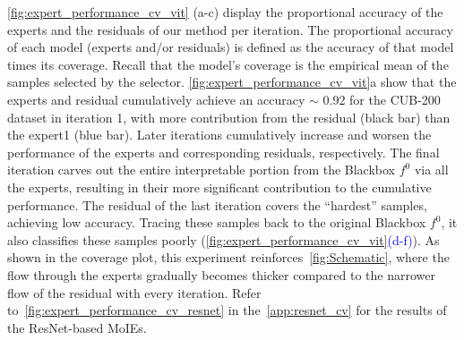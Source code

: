 \cref{fig:expert_performance_cv_vit} (a-c) display the proportional accuracy of the experts and the residuals of our method per iteration. The proportional accuracy of each model (experts and/or residuals) is defined as the accuracy of that model times its coverage. Recall that the model's coverage is the empirical mean of the samples selected by the selector. 
\cref{fig:expert_performance_cv_vit}a show that the experts and residual cumulatively achieve an accuracy $\sim$ 0.92 for the CUB-200 dataset in iteration 1, with more contribution from the residual (black bar) than the expert1 (blue bar). Later iterations cumulatively increase and worsen the performance of the experts and corresponding residuals, respectively. The final iteration carves out the entire interpretable portion from the Blackbox $f^0$ via all the experts, resulting in their more significant contribution to the cumulative performance. The residual of the last iteration covers the ``hardest'' samples, achieving low accuracy. Tracing these samples back to the original Blackbox $f^0$, it also classifies these samples poorly (\cref{fig:expert_performance_cv_vit}\textcolor{blue}{(d-f)}).
As shown in the coverage plot, this experiment reinforces~\cref{fig:Schematic}, where the flow through the experts gradually becomes thicker compared to the narrower flow of the residual with every iteration. Refer to~\cref{fig:expert_performance_cv_resnet} in the~\cref{app:resnet_cv} for the results of the ResNet-based MoIEs.


